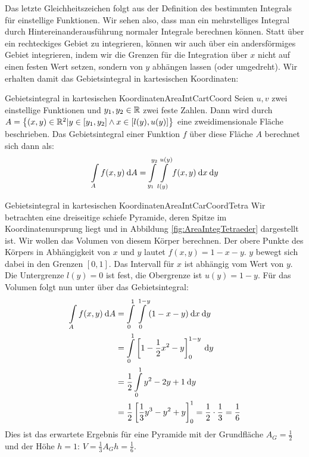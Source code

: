 Das letzte Gleichheitszeichen folgt aus der Definition des bestimmten Integrals für einstellige Funktionen. Wir sehen also, dass man ein mehrstelliges Integral durch Hintereinanderausführung normaler Integrale berechnen können. Statt über ein rechteckiges Gebiet zu integrieren, können wir auch über ein andersförmiges Gebiet integrieren, indem wir die Grenzen für die Integration über $x$ nicht auf einen festen Wert setzen, sondern von $y$ abhängen lassen (oder umgedreht). Wir erhalten damit das Gebietsintegral in kartesischen Koordinaten:

\begin{definition}{Gebietsintegral in kartesischen Koordinaten}{AreaIntCartCoord}
    Seien $u,v$ zwei einstellige Funktionen und $y_1,y_2\in\mathbb{R}$ zwei feste Zahlen. Dann wird durch $A = \left\lbrace (x,y) \in \mathbb{R}^2 | y \in [y_1,y_2] \land x \in [l(y), u(y)] \right\rbrace$ eine zweidimensionale Fläche beschrieben. Das Gebietsintegral einer Funktion $f$ über diese Fläche $A$ berechnet sich dann als:
    $$
        \int\limits_{A} f(x,y) \:\mathrm{d}{A} = \int\limits_{y_1}^{y_2} \int\limits_{l(y)}^{u(y)} f(x,y) \:\mathrm{d}{x} \:\mathrm{d}{y}
    $$
\end{definition}

\begin{example}{Gebietsintegral in kartesischen Koordinaten}{AreaIntCarCoordTetra}
    Wir betrachten eine dreiseitige schiefe Pyramide, deren Spitze im Koordinatenursprung liegt und in Abbildung \ref{fig:AreaIntegTetraeder} dargestellt ist. Wir wollen das Volumen von diesem Körper berechnen. Der obere Punkte des Körpers in Abhängigkeit von $x$ und $y$ lautet $f(x,y) = 1-x-y$. $y$ bewegt sich dabei in den Grenzen $[0,1]$. Das Intervall für $x$ ist abhängig vom Wert von $y$. Die Untergrenze $l(y) = 0$ ist fest, die Obergrenze ist $u(y) = 1 - y$. Für das Volumen folgt nun unter über das Gebietsintegral:
    \begin{alignat*}{1}
        \int\limits_{A} f(x,y) \:\mathrm{d}{A} & = \int\limits_{0}^{1} \int\limits_{0}^{1-y} (1-x-y) \:\mathrm{d}{x} \:\mathrm{d}{y} \\
                                        & = \int\limits_{0}^{1} \left[1-\frac{1}{2}x^2-y\right]_{0}^{1-y} \:\mathrm{d}{y} \\
                                        & = \frac{1}{2} \int\limits_{0}^{1} y^2-2y+1 \:\mathrm{d}{y} \\
                                        & = \frac{1}{2} \left[\frac{1}{3}y^3-y^2+y\right]_0^1 = \frac{1}{2} \cdot \frac{1}{3} = \frac{1}{6}
    \end{alignat*}
    Dies ist das erwartete Ergebnis für eine Pyramide mit der Grundfläche $A_G = \frac{1}{2}$ und der Höhe $h=1$: $V = \frac{1}{3} A_G h = \frac{1}{6}$.
\end{example}

